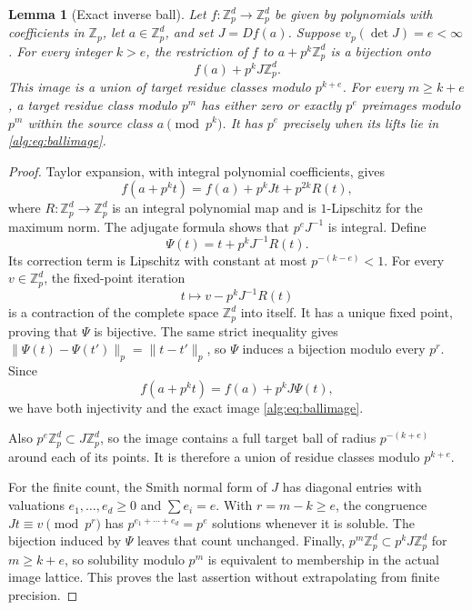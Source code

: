 \documentclass[11pt]{article}
\numberwithin{equation}{section}
\theoremstyle{plain}
\theoremstyle{plain}
\newtheorem{lemma}[lemma]{Lemma}
\theoremstyle{plain}
\theoremstyle{definition}
\theoremstyle{definition}
\theoremstyle{definition}
\theoremstyle{remark}
\newcommand{\Z}{\mathbb Z}\newcommand{\Q}{\mathbb Q}
\begin{document}
\begin{lemma}[Exact inverse ball]\label{alg:lem:ball}
Let $f:\Z_p^d\to\Z_p^d$ be given by polynomials with coefficients in
$\Z_p$, let $a\in\Z_p^d$, and set $J=Df(a)$. Suppose
$v_p(\det J)=e<\infty$. For every integer $k>e$, the restriction of $f$
to $a+p^k\Z_p^d$ is a bijection onto
\begin{equation}\label{alg:eq:ballimage}
 f(a)+p^kJ\Z_p^d.
\end{equation}
This image is a union of target residue classes modulo $p^{k+e}$.
For every $m\ge k+e$, a target residue class modulo $p^m$ has either
zero or exactly $p^e$ preimages modulo $p^m$ within the source class
$a\pmod{p^k}$. It has $p^e$ precisely when its lifts lie in
\eqref{alg:eq:ballimage}.
\end{lemma}
\begin{proof}
Taylor expansion, with integral polynomial coefficients, gives
\[
 f(a+p^kt)=f(a)+p^kJt+p^{2k}R(t),
\]
where $R:\Z_p^d\to\Z_p^d$ is an integral polynomial map and is
$1$-Lipschitz for the maximum norm. The adjugate formula shows that
$p^eJ^{-1}$ is integral. Define
\[
 \Psi(t)=t+p^kJ^{-1}R(t).
\]
Its correction term is Lipschitz with constant at most $p^{-(k-e)}<1$.
For every $v\in\Z_p^d$, the fixed-point iteration
\[
 t\longmapsto v-p^kJ^{-1}R(t)
\]
is a contraction of the complete space $\Z_p^d$ into itself. It has a
unique fixed point, proving that $\Psi$ is bijective. The same strict
inequality gives
$\|\Psi(t)-\Psi(t')\|_p=\|t-t'\|_p$, so $\Psi$ induces a bijection
modulo every $p^r$. Since
\[
 f(a+p^kt)=f(a)+p^kJ\Psi(t),
\]
we have both injectivity and the exact image \eqref{alg:eq:ballimage}.

Also $p^e\Z_p^d\subset J\Z_p^d$, so the image contains a full target
ball of radius $p^{-(k+e)}$ around each of its points. It is therefore
a union of residue classes modulo $p^{k+e}$.

For the finite count, the Smith normal form of $J$ has diagonal entries
with valuations $e_1,\ldots,e_d\ge0$ and $\sum e_i=e$. With
$r=m-k\ge e$, the congruence $Jt\equiv v\pmod{p^r}$ has
$p^{e_1+\cdots+e_d}=p^e$ solutions whenever it is soluble.
The bijection induced by $\Psi$ leaves that count unchanged. Finally,
$p^m\Z_p^d\subset p^kJ\Z_p^d$ for $m\ge k+e$, so solubility modulo
$p^m$ is equivalent to membership in the actual image lattice. This
proves the last assertion without extrapolating from finite precision.
\end{proof}
\end{document}
